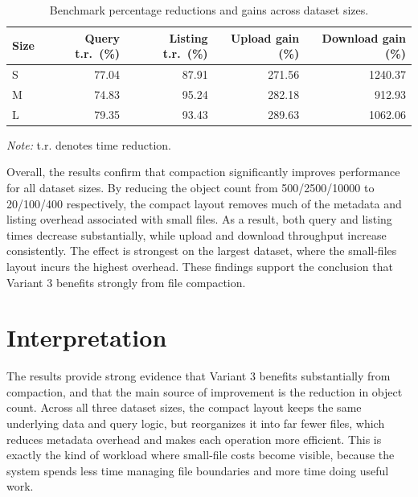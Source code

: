 \documentclass{article}
\begin{document}
\begin{table}[htbp]
    \centering
    \footnotesize
    \begin{tabular}{lrrrr}
        \hline
        Size & Query t.r.\ (\%) & Listing t.r.\ (\%) & Upload gain (\%) & Download gain (\%) \\
        \hline
        S & 77.04 & 87.91 & 271.56 & 1240.37 \\
        M & 74.83 & 95.24 & 282.18 & 912.93 \\
        L & 79.35 & 93.43 & 289.63 & 1062.06 \\
        \hline
    \end{tabular}
    \caption{Benchmark percentage reductions and gains across dataset sizes.}
    \label{table_reduction}
    \vspace{2mm}
    
    \begin{minipage}{0.9\linewidth}
        \footnotesize
        \textit{Note:} t.r. denotes time reduction.
    \end{minipage}
\end{table}


Overall, the results confirm that compaction significantly improves performance for all dataset sizes. By reducing the object count from 500/2500/10000 to 20/100/400 respectively, the compact layout removes much of the metadata and listing overhead associated with small files. As a result, both query and listing times decrease substantially, while upload and download throughput increase consistently. The effect is strongest on the largest dataset, where the small-files layout incurs the highest overhead. These findings support the conclusion that Variant 3 benefits strongly from file compaction.
\newpage

\section{Interpretation}
The results provide strong evidence that Variant 3 benefits substantially from compaction, and that the main source of improvement is the reduction in object count. Across all three dataset sizes, the compact layout keeps the same underlying data and query logic, but reorganizes it into far fewer files, which reduces metadata overhead and makes each operation more efficient. This is exactly the kind of workload where small-file costs become visible, because the system spends less time managing file boundaries and more time doing useful work.
\end{document}
